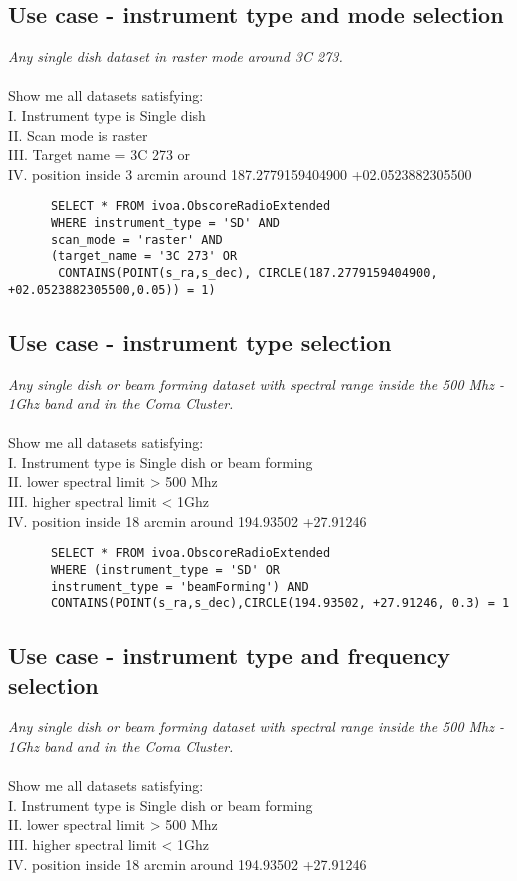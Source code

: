 \subsection{Use case -  instrument type and mode selection }
\textit{Any single dish  dataset  in raster mode around 3C 273.}\\ \\
Show me all datasets satisfying:\\
I. Instrument type is Single dish \\
II. Scan mode is raster \\
III. Target name = 3C 273 or \\
IV. position inside 3 arcmin around  	187.2779159404900 +02.0523882305500
\begin{verbatim}
      SELECT * FROM ivoa.ObscoreRadioExtended
      WHERE instrument_type = 'SD' AND
      scan_mode = 'raster' AND
      (target_name = '3C 273' OR
       CONTAINS(POINT(s_ra,s_dec), CIRCLE(187.2779159404900, +02.0523882305500,0.05)) = 1)     
\end{verbatim}

\subsection{Use case - instrument type selection}
\textit{Any single dish or beam forming dataset  with spectral range inside the 500 Mhz - 1Ghz band and in the Coma Cluster.}\\ \\
Show me all datasets satisfying:\\
I. Instrument type is Single dish or beam forming \\
II. lower spectral limit > 500 Mhz \\
III. higher spectral limit < 1Ghz \\
IV. position inside 18 arcmin around 194.93502 +27.91246
\begin{verbatim}
      SELECT * FROM ivoa.ObscoreRadioExtended
      WHERE (instrument_type = 'SD' OR
      instrument_type = 'beamForming') AND
      CONTAINS(POINT(s_ra,s_dec),CIRCLE(194.93502, +27.91246, 0.3) = 1     
\end{verbatim}


\subsection{Use case - instrument type and frequency selection }
\textit{Any single dish or beam forming dataset  with spectral range inside the 500 Mhz - 1Ghz band and in the Coma Cluster.}\\ \\
Show me all datasets satisfying:\\
I. Instrument type is Single dish or beam forming \\
II. lower spectral limit > 500 Mhz \\
III. higher spectral limit < 1Ghz \\
IV. position inside 18 arcmin around 194.93502 +27.91246

